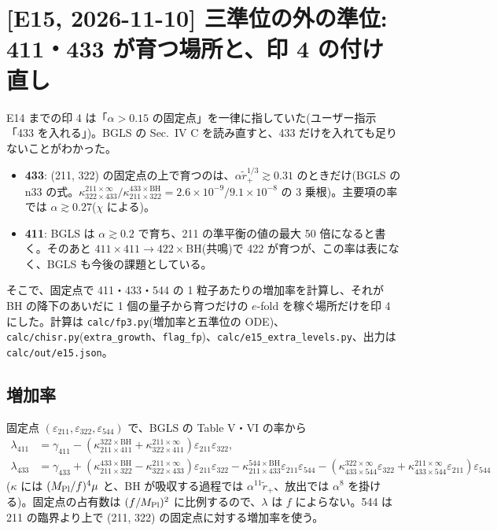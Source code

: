 \section{[E15, 2026-11-10] 三準位の外の準位: 411・433 が育つ場所と、印 4 の付け直し}\label{sec:e15}

E14 までの印 4 は「$\alpha>0.15$ の固定点」を一律に指していた(ユーザー指示「433 を入れる」)。BGLS の Sec.~IV C を読み直すと、433 だけを入れても足りないことがわかった。
\begin{itemize}
\item \textbf{433}: (211, 322) の固定点の上で育つのは、$\alpha\tilde r_+^{1/3}\gtrsim0.31$ のときだけ(BGLS の n33 の式。$\kappa^{211\times\infty}_{322\times433}/\kappa^{433\times\mathrm{BH}}_{211\times322}=2.6\times10^{-9}/9.1\times10^{-8}$ の 3 乗根)。主要項の率では $\alpha\gtrsim0.27$($\chi$ による)。
\item \textbf{411}: BGLS は $\alpha\gtrsim0.2$ で育ち、211 の準平衡の値の最大 50 倍になると書く。そのあと $411\times411\to422\times\mathrm{BH}$(共鳴)で 422 が育つが、この率は表になく、BGLS も今後の課題としている。
\end{itemize}
そこで、固定点で 411・433・544 の 1 粒子あたりの増加率を計算し、それが BH の降下のあいだに 1 個の量子から育つだけの $e$-fold を稼ぐ場所だけを印 4 にした。計算は \texttt{calc/fp3.py}(増加率と五準位の ODE)、\texttt{calc/chisr.py}(\texttt{extra\_growth}、\texttt{flag\_fp})、\texttt{calc/e15\_extra\_levels.py}、出力は \texttt{calc/out/e15.json}。

\subsection{増加率}

固定点 $(\varepsilon_{211},\varepsilon_{322},\varepsilon_{544})$ で、BGLS の Table V・VI の率から
\begin{align}
\lambda_{411}&=\gamma_{411}-(\kappa^{322\times\mathrm{BH}}_{211\times411}+\kappa^{211\times\infty}_{322\times411})\varepsilon_{211}\varepsilon_{322},\\
\lambda_{433}&=\gamma_{433}+(\kappa^{433\times\mathrm{BH}}_{211\times322}-\kappa^{211\times\infty}_{322\times433})\varepsilon_{211}\varepsilon_{322}
-\kappa^{544\times\mathrm{BH}}_{211\times433}\varepsilon_{211}\varepsilon_{544}-(\kappa^{322\times\infty}_{433\times544}\varepsilon_{322}+\kappa^{211\times\infty}_{433\times544}\varepsilon_{211})\varepsilon_{544}
\end{align}
($\kappa$ には $(M_\mathrm{Pl}/f)^4\mu$ と、BH が吸収する過程では $\alpha^{11}\tilde r_+$、放出では $\alpha^8$ を掛ける)。固定点の占有数は $(f/M_\mathrm{Pl})^2$ に比例するので、$\lambda$ は $f$ によらない。544 は 211 の臨界より上で (211, 322) の固定点に対する増加率を使う。

